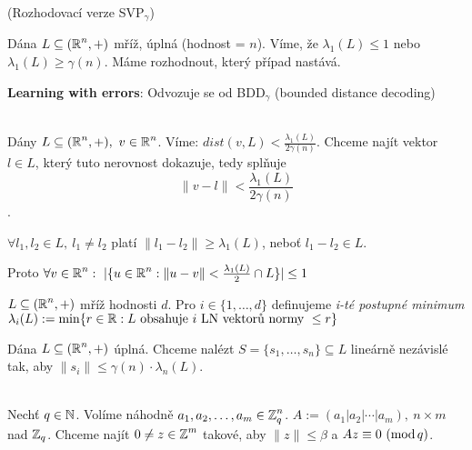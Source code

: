 \begin{definition}
(Rozhodovací verze SVP$_\gamma$)

Dána $L \subseteq (\operatorname{\mathbb{R}} ^n, +)$ mříž, úplná (hodnost = $n$). Víme, že $\lambda_1(L) \leq 1 $ nebo $\lambda_1(L) \geq \gamma(n)$. Máme rozhodnout, který případ nastává.
\end{definition}

\textbf{Learning with errors}: Odvozuje se od BDD$_\gamma$ (bounded distance decoding) 

\begin{definition}\phantom{}\\
Dány $L \subseteq (\operatorname{\mathbb{R}}^n, +), \ v\in \operatorname{\mathbb{R}}^n$. Víme: $dist(v,L) < \frac{\lambda_1(L)}{2\gamma(n)}$. Chceme najít vektor $l\in L$, který tuto nerovnost dokazuje, tedy splňuje $$\|v-l\| < \frac{\lambda_1(L)}{2 \gamma(n)}$$.
\end{definition}

\begin{note}
$\forall l_1, l_2 \in L, \ l_1 \neq l_2$ platí $\|l_1-l_2\| \geq \lambda_1(L)$, neboť $l_1 - l_2 \in L$. 

Proto $\forall v \in \operatorname{\mathbb{R}}^n: \ |\{u \in \operatorname{\mathbb{R}}^n : \|u-v\|<\frac{\lambda_1(L)}{2} \cap L\}| \leq 1$
\end{note}

\begin{definition}
$L \subseteq (\operatorname{\mathbb{R}}^n, +)$ mříž hodnosti $d$. Pro $i \in \{1, \dots, d\}$ definujeme \emph{i-té postupné minimum} $\lambda_i(L) := \min\{r \in \Real: L \ \text{obsahuje } i \text{ LN vektorů normy } \leq r\}$
\end{definition}

\begin{definition}
Dána $L \subseteq (\operatorname{\mathbb{R}}^n, +) $ úplná. Chceme nalézt $S = \{s_1, \ldots, s_n\} \subseteq L$ lineárně nezávislé tak, aby $\|s_i\|\leq\gamma(n)\cdot\lambda_n(L)$.
\end{definition}

\begin{definition}\phantom{}\\
Nechť $q \in \operatorname{\mathbb{N}}$. Volíme náhodně $a_1, a_2, \dots, a_m \in \operatorname{\mathbb{Z}}^n_q$. $A:= (a_1|a_2|\cdots|a_m),\ n \times m$ nad $\operatorname{\mathbb{Z}}_q$. Chceme najít $0 \neq z\in\operatorname{\mathbb{Z}}^m$ takové, aby $\|z\|\leq\beta$ a $Az\equiv0\ (\operatorname{mod} q)$.
\end{definition}


